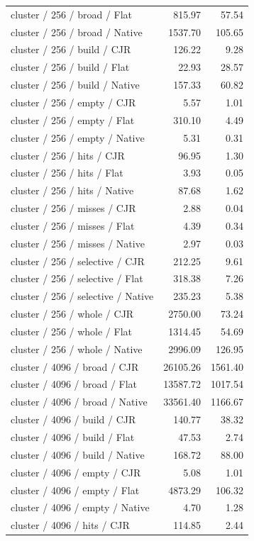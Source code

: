 \begin{longtable}{p{}rr}
cluster / 256 / broad / Flat & 815.97 & 57.54 \\
cluster / 256 / broad / Native & 1537.70 & 105.65 \\
cluster / 256 / build / CJR & 126.22 & 9.28 \\
cluster / 256 / build / Flat & 22.93 & 28.57 \\
cluster / 256 / build / Native & 157.33 & 60.82 \\
cluster / 256 / empty / CJR & 5.57 & 1.01 \\
cluster / 256 / empty / Flat & 310.10 & 4.49 \\
cluster / 256 / empty / Native & 5.31 & 0.31 \\
cluster / 256 / hits / CJR & 96.95 & 1.30 \\
cluster / 256 / hits / Flat & 3.93 & 0.05 \\
cluster / 256 / hits / Native & 87.68 & 1.62 \\
cluster / 256 / misses / CJR & 2.88 & 0.04 \\
cluster / 256 / misses / Flat & 4.39 & 0.34 \\
cluster / 256 / misses / Native & 2.97 & 0.03 \\
cluster / 256 / selective / CJR & 212.25 & 9.61 \\
cluster / 256 / selective / Flat & 318.38 & 7.26 \\
cluster / 256 / selective / Native & 235.23 & 5.38 \\
cluster / 256 / whole / CJR & 2750.00 & 73.24 \\
cluster / 256 / whole / Flat & 1314.45 & 54.69 \\
cluster / 256 / whole / Native & 2996.09 & 126.95 \\
cluster / 4096 / broad / CJR & 26105.26 & 1561.40 \\
cluster / 4096 / broad / Flat & 13587.72 & 1017.54 \\
cluster / 4096 / broad / Native & 33561.40 & 1166.67 \\
cluster / 4096 / build / CJR & 140.77 & 38.32 \\
cluster / 4096 / build / Flat & 47.53 & 2.74 \\
cluster / 4096 / build / Native & 168.72 & 88.00 \\
cluster / 4096 / empty / CJR & 5.08 & 1.01 \\
cluster / 4096 / empty / Flat & 4873.29 & 106.32 \\
cluster / 4096 / empty / Native & 4.70 & 1.28 \\
cluster / 4096 / hits / CJR & 114.85 & 2.44 \\

\end{longtable}
